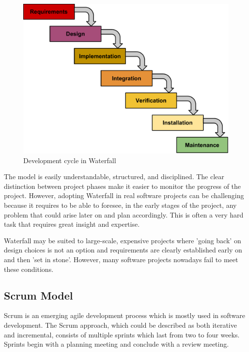 \begin{figure}[h]
\begin{center}
\includegraphics[scale=0.6]{../Figures/Waterfall-model.pdf}
\end{center}
\caption{Development cycle in Waterfall}
\label{figure:waterfall-model}
\end{figure}

The model is easily understandable, structured, and disciplined.
The clear distinction between project phases make it easier to monitor the progress of the project.
However, adopting Waterfall in real software projects can be challenging because it requires to be able to
foresee, in the early stages of the project, any problem that could arise later on and plan accordingly.
This is often a very hard task that requires great insight and expertise.

Waterfall may be suited to large-scale, expensive projects where 'going back' on design choices is not an
option and requirements are clearly established early on and then 'set in stone'.
However, many software projects nowadays fail to meet these conditions.

\subsection{Scrum Model}

Scrum is an emerging agile development process which is mostly used in software development.
The Scrum approach, which could be described as both iterative and incremental, consists of multiple
sprints which last from two to four weeks. Sprints begin with a planning meeting and conclude with a review meeting.

